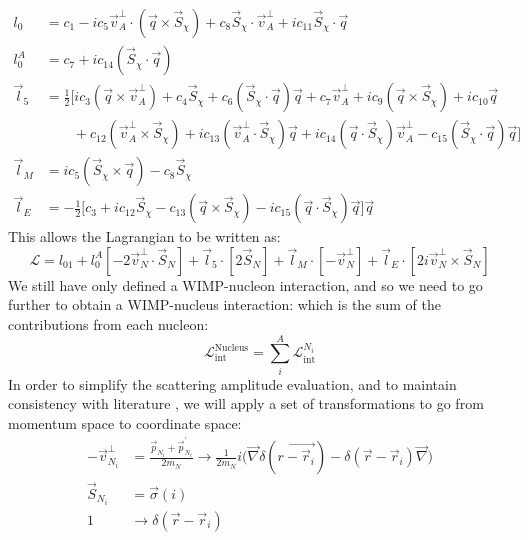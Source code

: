 \begin{equation}
\begin{split}
    l_0  & = c_1 - ic_5 \vec{v}^{\perp}_{A} \cdot(\vec{q} \times \vec{S}_\chi) + c_8 \vec{S}_\chi \cdot \vec{v}^{\perp}_{A} + ic_{11} \vec{S}_\chi \cdot \vec{q} \\
    l^A_0 &= c_7 + ic_{14} (\vec{S}_\chi \cdot \vec{q}) \\
    \vec{l}_5 &= \frac{1}{2} \big[ ic_3 (\vec{q} \times \vec{v}^{\perp}_{A}) + c_4 \vec{S}_\chi + c_6 (\vec{S}_\chi \cdot \vec{q}) \vec{q} + c_7 \vec{v}^{\perp}_{A} + ic_9 (\vec{q} \times \vec{S}_\chi) + ic_{10} \vec{q} \\
    &\qquad+ c_12 (\vec{v}^{\perp}_{A} \times \vec{S}_\chi) + ic_{13} (\vec{v}^{\perp}_{A} \cdot \vec{S}_\chi) \vec{q} + ic_{14}(\vec{q} \cdot \vec{S}_\chi)\vec{v}^{\perp}_{A} - c_{15} (\vec{S}_\chi \cdot \vec{q} ) \vec{q} \bigg] \\
    \vec{l}_M &= ic_5 (\vec{S}_\chi \times \vec{q}) - c_8 \vec{S}_\chi \\
    \vec{l}_E &= -\frac{1}{2} \bigg[ c_3 + ic_{12} \vec{S}_\chi - c_{13} (\vec{q} \times \vec{S}_\chi) - ic_{15} (\vec{q} \cdot \vec{S}_{\chi}) \vec{q} \bigg] \vec{q}
\end{split}
\label{eq:eft_operator_lagrangian_charges_and_currents}
\end{equation}
This allows the Lagrangian to be written as:
\begin{equation}
    \mathcal{L} = l_01 + l_0^A[-2\vec{v}^{\perp}_N \cdot \vec{S}_N] + \vec{l}_{5} \cdot [2\vec{S}_N] + \vec{l}_{M} \cdot [-\vec{v}^{\perp}_N] + \vec{l}_{E} \cdot [2i\vec{v}^{\perp}_N \times \vec{S}_{N} ]
\end{equation}
We still have only defined a WIMP-nucleon interaction, and so we need to go further to obtain a WIMP-nucleus interaction: which is the sum of the contributions from each nucleon:
\begin{equation}
    \mathcal{L}^{\text{Nucleus}}_{\text{int}} = \sum_{i}^{A} \mathcal{L}^{N_i}_{\text{int}}
\end{equation}
In order to simplify the scattering amplitude evaluation, and to maintain consistency with literature \cite{Fitzpatrick_2013_ref}, we will apply a set of transformations to go from momentum space to coordinate space:
\begin{equation}
    \begin{split}
        -\vec{v}^{\perp}_{N_i} &= \frac{\vec{p}_{N_i} + \vec{p}^{'}_{N_i}}{2m_N} \rightarrow \frac{1}{2m_N}i \Bigg( \vec{\nabla}\delta(\vec{r - \vec{r}_i}) - \delta(\vec{r} - \vec{r}_i) \vec{\nabla} \Bigg) \\
        \vec{S}_{N_i} &= \vec{\sigma}(i) \\
        1 &\rightarrow \delta(\vec{r} - \vec{r}_i)
    \end{split}
\end{equation}

